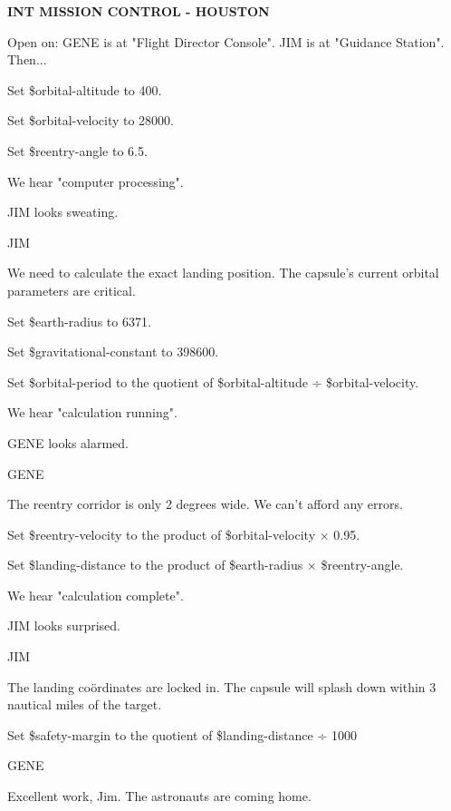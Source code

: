 \documentclass[11pt,letterpaper,oldstylefigures]{memoir}
\newcommand{\slugline}[1]{\nobreak\textbf{\MakeUppercase{#1}}\par\nobreak\vspace{1\baselineskip}}
\newcommand{\speaker}[1]{\nobreak\hspace*{0.333\textwidth}\MakeUppercase{#1}\par\nobreak\vspace{0.5\baselineskip}}
\newcommand{\dialogue}[1]{\nobreak\hspace*{0.25\textwidth}\begin{minipage}{0.5\textwidth}#1\end{minipage}\par\vspace{1\baselineskip}}
\newcommand{\stagedir}[1]{#1\par\vspace{1\baselineskip}}
\newenvironment{FountainExample}
  {\begingroup
  \ttfamily\small
   \setlength{\parindent}{0pt}
  \setlength{\parskip}{0.5em}
  \allowdisplaybreaks
  \setlength{\displaywidowpenalty}{0}
  \setlength{\widowpenalty}{0}
  \setlength{\clubpenalty}{0}
  \setlength{\interlinepenalty}{0}
}
  {\endgroup}
\begin{document}
\begin{FountainExample}
\slugline{INT MISSION CONTROL - HOUSTON}

\stagedir{Open on: GENE is at "Flight Director Console". JIM is at "Guidance Station". Then...}

\stagedir{Set \$orbital-altitude to 400.}

\stagedir{Set \$orbital-velocity to 28000.}

\stagedir{Set \$reentry-angle to 6.5.}

\stagedir{We hear "computer processing".}

\stagedir{JIM looks sweating.}

\speaker{JIM}
\dialogue{We need to calculate the exact landing position. The capsule's current orbital parameters are critical.}

\stagedir{Set \$earth-radius to 6371.}

\stagedir{Set \$gravitational-constant to 398600.}

\stagedir{Set \$orbital-period to the quotient of \$orbital-altitude ÷ \$orbital-velocity.}

\stagedir{We hear "calculation running".}

\stagedir{GENE looks alarmed.}

\speaker{GENE}
\dialogue{The reentry corridor is only 2 degrees wide. We can't afford any errors.}

\stagedir{Set \$reentry-velocity to the product of \$orbital-velocity × 0.95.}

\stagedir{Set \$landing-distance to the product of \$earth-radius × \$reentry-angle.}

\stagedir{We hear "calculation complete".}

\stagedir{JIM looks surprised.}

\speaker{JIM}
\dialogue{The landing coördinates are locked in. The capsule will splash down within 3 nautical miles of the target.}

\stagedir{Set \$safety-margin to the quotient of \$landing-distance ÷ 1000}

\speaker{GENE}
\dialogue{Excellent work, Jim. The astronauts are coming home.}
\end{FountainExample}
\end{document}
